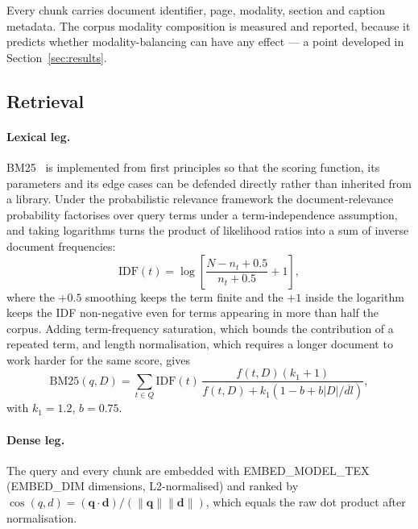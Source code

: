 \documentclass[preprint,3p,times]{elsarticle}
\begin{document}
Every chunk carries document identifier, page, modality, section and caption
metadata. The corpus modality composition is measured and reported, because it
predicts whether modality-balancing can have any effect --- a point developed
in Section~\ref{sec:results}.

\subsection{Retrieval}

\paragraph{Lexical leg.} BM25~\cite{robertson2004prf} is implemented from first
principles so that the scoring function, its parameters and its edge cases can
be defended directly rather than inherited from a library. Under the
probabilistic relevance framework the document-relevance probability factorises
over query terms under a term-independence assumption, and taking logarithms
turns the product of likelihood ratios into a sum of inverse document
frequencies:
\begin{equation}
\mathrm{IDF}(t)=\log\left[\frac{N-n_t+0.5}{n_t+0.5}+1\right],
\end{equation}
where the $+0.5$ smoothing keeps the term finite and the $+1$ inside the
logarithm keeps the IDF non-negative even for terms appearing in more than half
the corpus. Adding term-frequency saturation, which bounds the contribution of
a repeated term, and length normalisation, which requires a longer document to
work harder for the same score, gives
\begin{equation}
\mathrm{BM25}(q,D)=\sum_{t\in Q}\mathrm{IDF}(t)\,
\frac{f(t,D)(k_1+1)}{f(t,D)+k_1\left(1-b+b\lvert D\rvert/\overline{dl}\right)},
\end{equation}
with $k_1=1.2$, $b=0.75$.

\paragraph{Dense leg.} The query and every chunk are embedded with
{{EMBED_MODEL_TEX}} ({{EMBED_DIM}} dimensions, L2-normalised)
and ranked by $\cos(q,d)=(\mathbf{q}\cdot\mathbf{d})/(\lVert\mathbf{q}\rVert\lVert\mathbf{d}\rVert)$,
which equals the raw dot product after normalisation.
\end{document}
